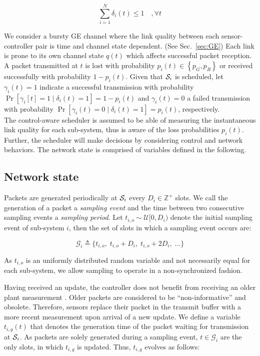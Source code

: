 \begin{equation}
  \sum_{i=1}^{N}{\delta_i(t) \leq 1 \quad, \forall t}
\end{equation}

We consider a bursty GE channel where the link quality between each
sensor-controller pair is time and channel state dependent. (See
Sec.~{\ref{sec:GE}}) Each link is prone to its own channel state $q(t)$ which
affects successful packet reception. A packet transmitted at $t$ is lost with
probability $p_i(t) \in \left\{p_G,p_B\right\}$ or received successfully with
probability $1-p_i(t)$. Given that $\mathcal{S}_i$ is scheduled, let $\gamma_i(t)=1$
indicate a successful transmission with probability $\Pr[\gamma_i[t]=1 \mid
\delta_i(t)=1] = 1-p_i(t)$ and $\gamma_i(t)=0$ a failed transmission with
probability $\Pr[\gamma_i(t)=0 \mid \delta_i(t)=1] = p_i(t)$, respectively. \\ 
The control-aware scheduler is assumed to be able of measuring the instantaneous
link quality for each sub-system, thus is aware of the loss probabilities
$p_i(t)$. Further, the scheduler will make decisions by considering control and
network behaviors. The network state is comprised of variables defined in the
following.

\subsection{Network state}

Packets are generated periodically at $\mathcal{S}_i$ every $D_i \in \mathbb{Z}^+$
slots. We call the generation of a packet a \textit{sampling event} and the time
between two consecutive sampling events a \textit{sampling period}. Let $t_{i,o}
\sim \mathcal{U}[0, D_i)$ denote the initial sampling event of sub-system $i$,
then the set of slots in which a sampling event occurs are:

\begin{equation}
  \mathcal{G}_i \triangleq \lbrace t_{i,o}, \; t_{i,o} + D_{i}, \; t_{i,o} + 2 D_{i}, \; \dots \rbrace 
\end{equation}

As $t_{i,o}$ is an uniformly distributed random variable and not necessarily
equal for each sub-system, we allow sampling to operate in a non-synchronized
fashion. 

Having received an update, the controller does not benefit from receiving an
older plant measurement \cite{costa2016age}. Older packets are considered to be
``non-informative'' and obsolete. Therefore, sensors replace their packet in the
transmit buffer with a more recent measurement upon arrival of a new update. We
define a variable $t_{i,g}(t)$ that denotes the generation time of the packet
waiting for transmission at $\mathcal{S}_i$. As packets are solely generated during a
sampling event, $t \in \mathcal{G}_i$ are the only slots, in which $t_{i,g}$ is
updated. Thus, $t_{i,g}$ evolves as follows:

